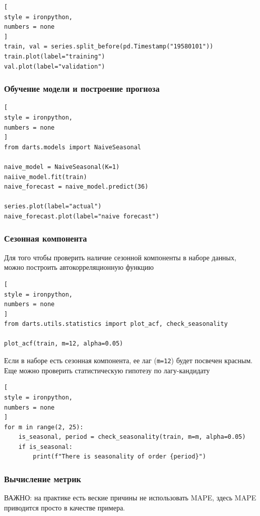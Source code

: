 \documentclass[%
	11pt,
	a4paper,
	utf8,
		]{article}
\begin{document}
\begin{lstlisting}[
style = ironpython,
numbers = none
]
train, val = series.split_before(pd.Timestamp("19580101"))
train.plot(label="training")
val.plot(label="validation")
\end{lstlisting}

\subsubsection{Обучение модели и построение прогноза}

\begin{lstlisting}[
style = ironpython,
numbers = none
]
from darts.models import NaiveSeasonal

naive_model = NaiveSeasonal(K=1)
naiive_model.fit(train)
naive_forecast = naive_model.predict(36)

series.plot(label="actual")
naive_forecast.plot(label="naive forecast")
\end{lstlisting}

\subsubsection{Сезонная компонента}

Для того чтобы проверить наличие сезонной компоненты в наборе данных, можно построить автокорреляционную функцию
\begin{lstlisting}[
style = ironpython,
numbers = none
]
from darts.utils.statistics import plot_acf, check_seasonality

plot_acf(train, m=12, alpha=0.05)
\end{lstlisting}

Если в наборе есть сезонная компонента, ее лаг (\verb|m=12|) будет посвечен красным. Еще можно проверить статистическую гипотезу по лагу-кандидату
\begin{lstlisting}[
style = ironpython,
numbers = none
]
for m in range(2, 25):
    is_seasonal, period = check_seasonality(train, m=m, alpha=0.05)
    if is_seasonal:
        print(f"There is seasonality of order {period}")
\end{lstlisting}

\subsubsection{Вычисление метрик}

ВАЖНО: на практике есть веские причины {\color{red}не использовать MAPE}, здесь MAPE приводится просто в качестве примера.
\end{document}
